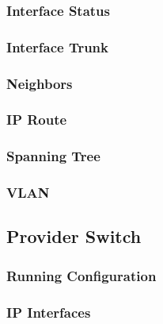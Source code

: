\subsubsection{Interface Status}


\subsubsection{Interface Trunk}


\subsubsection{Neighbors}


\subsubsection{IP Route}


\subsubsection{Spanning Tree}


\subsubsection{VLAN}





\subsection{Provider Switch}
\subsubsection{Running Configuration}


\subsubsection{IP Interfaces}


